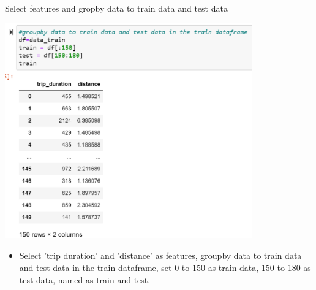 \documentclass[
 size=14pt,
 paper=smartboard,  %
 mode=present, 		%
 display=slides, 	%
 style=tuliplab,  	%
 pauseslide,
 fleqn,leqno]{powerdot}
\begin{document}
\begin{slide}{Select features and gropby data to train data and test data}
	{\begin{flushleft}
			\includegraphics[width=0.8\textwidth]{figures/pe13.eps}
		\end{flushleft}
	}
	
	\begin{itemize}
		\item
		\smallskip
		Select 'trip duration' and 'distance' as features, groupby data to train data and test data in the train dataframe, set 0 to 150 as train data, 150 to 180 as test data, named as train and test.
		
	\end{itemize}
	
\end{slide}
\end{document}
